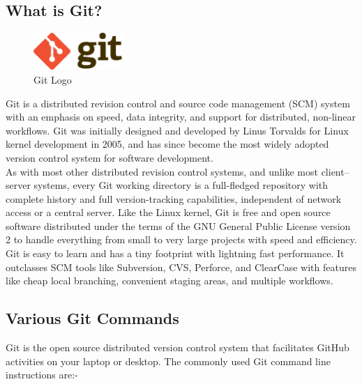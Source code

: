 \subsection{What is Git?}
\begin{figure}[!ht]
\centering
\includegraphics[width=0.3\textwidth]{images/git.png}                   
\caption{Git Logo}
\hspace{-1.5em}
\end{figure}
Git is a distributed revision control and source code management (SCM) system with an emphasis on speed, data integrity, and support for distributed, non-linear workflows. Git was initially designed and developed by Linus Torvalds for Linux kernel development in 2005, and has since become the most widely adopted version control system for software development.\\

As with most other distributed revision control systems, and unlike most client–server systems, every Git working directory is a full-fledged repository with complete history and full version-tracking capabilities, independent of network access or a central server. Like the Linux kernel, Git is free and open source software distributed under the terms of the GNU General Public License version 2 to handle everything from small to very large projects with speed and efficiency.\\

Git is easy to learn and has a tiny footprint with lightning fast performance. It outclasses SCM tools like Subversion, CVS, Perforce, and ClearCase with features like cheap local branching, convenient staging areas, and multiple workflows.\\


\subsection{Various Git Commands}

Git is the open source distributed version control system that facilitates GitHub activities on your laptop or desktop. The commonly used Git command line instructions are:-\\

